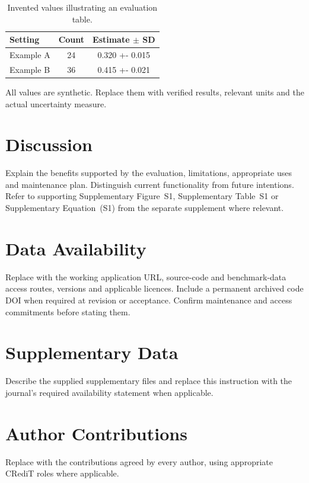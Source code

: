 \documentclass[unnumsec,webpdf,modern,large]{oup-authoring-template}
\begin{document}
\begin{table}[t]
\centering\small
\caption{Invented values illustrating an evaluation table.}
\label{tab:evaluation}
\begin{tabularx}{\linewidth}{@{}>{\raggedright\arraybackslash}X
 S[table-format=2.0] S[table-format=1.3(3)]@{}}
\toprule
Setting & {Count} & {Estimate $\pm$ SD}\\
\midrule
Example A & 24 & 0.320 +- 0.015\\
Example B & 36 & 0.415 +- 0.021\\
\bottomrule
\end{tabularx}
\par\smallskip\footnotesize\raggedright
All values are synthetic. Replace them with verified results, relevant
units and the actual uncertainty measure.
\end{table}

\section{Discussion}\label{sec:discussion}
Explain the benefits supported by the evaluation, limitations, appropriate
uses and maintenance plan. Distinguish current functionality from future
intentions. Refer to supporting Supplementary Figure~S1, Supplementary
Table~S1 or Supplementary Equation~(S1) from the separate supplement
where relevant.

\section*{Data Availability}
Replace with the working application URL, source-code and benchmark-data
access routes, versions and applicable licences. Include a permanent
archived code DOI when required at revision or acceptance. Confirm
maintenance and access commitments before stating them.

\section*{Supplementary Data}
Describe the supplied supplementary files and replace this instruction
with the journal's required availability statement when applicable.

\section*{Author Contributions}
Replace with the contributions agreed by every author, using appropriate
CRediT roles where applicable.
\end{document}
